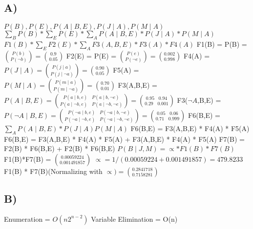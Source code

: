 \documentclass{article}
\begin{document}
	\subsection*{A)}
	$P(B),P(E),P(A\mid B,E),P(J\mid A),P(M\mid A)$
	\newline
	$\sum\nolimits_{B}P(B) * \sum\nolimits_{E}P(E) * \sum\nolimits_{A}P(A\mid B,E) * P(J\mid A)*P(M\mid A)$
	\newline
	$F1(B) * \sum\nolimits_{E}F2(E) * \sum\nolimits_{A}F3(A,B,E)*F3(A)*F4(A)$
	\newline
	F1(B) = P(B) = $\binom {P(b)}{P(\neg b)} = \binom {0.9}{0.05}$
	\newline
	F2(E) = P(E) = $\binom {P(e)}{P(\neg e)} = \binom {0.002}{0.998}$
	\newline
	F4(A) = $P(J\mid A) = \binom {P(j\mid a)}{P(j\mid \neg a)} = \binom {0.90}{0.05}$
	\newline
	F5(A) = $P(M\mid A) = \binom {P(m\mid a)}{P(m\mid \neg a)} = \binom {0.70}{0.01}$
	\newline
	F3(A,B,E) = $P(A\mid B,E) = \binom {P(a\mid b,e) \>\>\>\> P(a\mid b, \neg e)}{P(a\mid \neg b, e) \>\>\>\> P(a\mid \neg b, \neg e)} = \binom {0.95 \>\>\>\>0.94}{0.29 \>\>\>\> 0.001}$
	\newline
	F3($\neg A$,B,E) = $P(\neg A\mid B,E) = \binom {P(\neg a\mid b,e) \>\>\>\> P(\neg a\mid b, \neg e)}{P(\neg a\mid \neg b, e) \>\>\>\> P(\neg a\mid \neg b, \neg e)} = \binom {0.05 \>\>\>\>0.06}{0.71 \>\>\>\> 0.999}$
	\newline
	F6(B,E) = $\sum\nolimits_{A} P(A\mid B,E) * P(J\mid A)P(M\mid A)$
	\newline
	F6(B,E) = F3(A,B,E) * F4(A) * F5(A)
	\newline
	F6(B,E) = F3(A,B,E) * F4(A) * F5(A) + F3(A,B,E) * F4(A) * F5(A)
	\newline
	F7(B) = F2(B) * F6(B,E) + F2(B) * F6(B,E)
	\newline
	$P(B\mid J, M) = \propto * F1(B) * F7(B)$
	\newline
	F1(B)*F7(B) = $\binom {0.00059224}{0.001491857}$
	\newline
	$\propto = 1/(0.00059224 + 0.001491857) = 479.8233$
	\newline
	F1(B) * F7(B)(Normalizing with $\propto) = \binom {0.2841718}{0.7158281}$
	\subsection*{B)}
	Enumeration = $O(n2^{n-2})$
	\newline
Variable Elimination = O(n)
	\newline
\end{document}
